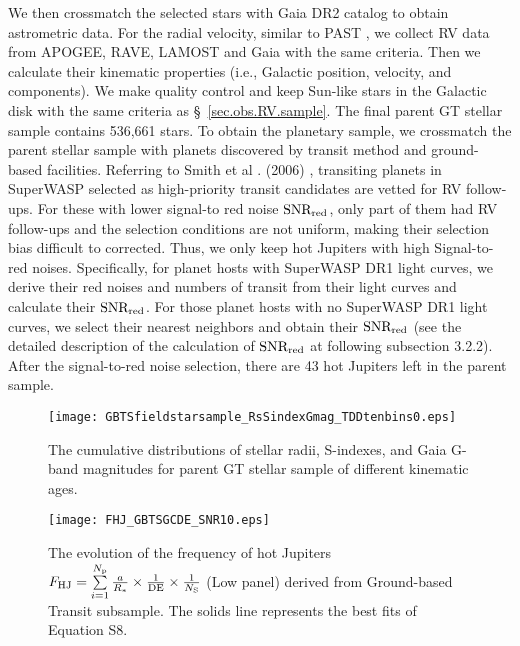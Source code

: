 \documentclass[twocolumn]{pnas-new}
\begin{document}
We then crossmatch the selected stars with Gaia DR2 catalog to obtain astrometric data.
For the radial velocity, similar to PAST \uppercase\expandafter{}, we collect RV data from APOGEE, RAVE, LAMOST and Gaia with the same criteria.
Then we calculate their kinematic properties (i.e., Galactic position, velocity, and components).
We make quality control and keep Sun-like stars in the Galactic disk with the same criteria as \S~\ref{sec.obs.RV.sample}.
The final parent GT stellar sample contains 536,661 stars.
To obtain the planetary sample, we crossmatch the parent stellar sample with planets discovered by transit method and ground-based facilities.
Referring to Smith et al . (2006) \citep{2006MNRAS.373.1151S}, transiting planets in SuperWASP  selected as high-priority transit
candidates are vetted for RV follow-ups.
For these with lower signal-to red noise $\rm SNR_{\rm red}$, only part of them \citep[e.g., WASP-22b, WASP-45 b with similar periods in data of different years;][]{2010AJ....140.2007M,2012MNRAS.422.1988A} had RV follow-ups and the selection conditions are not uniform, making their selection bias difficult to corrected.
Thus, we only keep hot Jupiters with high Signal-to-red noises.
Specifically, for planet hosts with SuperWASP DR1 light curves, we derive their red noises and numbers of transit from their light curves and calculate their $\rm SNR_{\rm red}$.
For those planet hosts with no SuperWASP DR1 light curves, we select their nearest neighbors and obtain their $\rm SNR_{\rm red}$ (see the detailed description of the calculation of $\rm SNR_{\rm red}$ at following subsection 3.2.2).
After the signal-to-red noise selection, there are 43 hot Jupiters left in the parent sample. 

\begin{figure}[!t]
\centering
\texttt{[image: GBTSfieldstarsample\_RsSindexGmag\_TDDtenbins0.eps]}
\caption{The cumulative distributions of stellar radii, S-indexes, and Gaia G-band magnitudes for parent GT stellar sample of different kinematic ages.
\label{figGBTSstellarproperties}}
\end{figure}

\begin{figure}[!t]
\centering
\texttt{[image: FHJ\_GBTSGCDE\_SNR10.eps]}
\caption{The evolution of the frequency of hot Jupiters $F_{\rm HJ} = \sum\limits_{i=1}^{N_{\rm p}}{\frac{a}{R_*} \times \frac{1}{\rm DE}} \times \frac{1}{N_{\rm S}}$ (Low panel) derived from Ground-based Transit subsample.
The solids line represents the best fits of Equation S8.
\label{figFHJGBTSGCDE}}
\end{figure}
\end{document}
